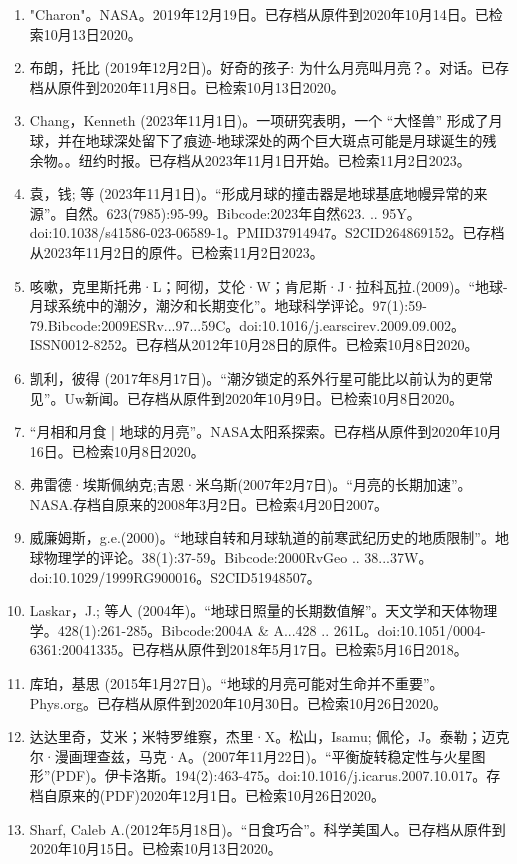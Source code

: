 \begin{enumerate}
\item "Charon"。NASA。2019年12月19日。已存档从原件到2020年10月14日。已检索10月13日2020。
\item 布朗，托比 (2019年12月2日)。好奇的孩子: 为什么月亮叫月亮？。对话。已存档从原件到2020年11月8日。已检索10月13日2020。
\item Chang，Kenneth (2023年11月1日)。一项研究表明，一个 “大怪兽” 形成了月球，并在地球深处留下了痕迹-地球深处的两个巨大斑点可能是月球诞生的残余物。。纽约时报。已存档从2023年11月1日开始。已检索11月2日2023。
\item 袁，钱; 等 (2023年11月1日)。“形成月球的撞击器是地球基底地幔异常的来源”。自然。623(7985):95-99。Bibcode:2023年自然623. .. 95Y。doi:10.1038/s41586-023-06589-1。PMID37914947。S2CID264869152。已存档从2023年11月2日的原件。已检索11月2日2023。  
\item 咳嗽，克里斯托弗·L；阿彻，艾伦·W；肯尼斯·J·拉科瓦拉.(2009)。“地球-月球系统中的潮汐，潮汐和长期变化”。地球科学评论。97(1):59-79.Bibcode:2009ESRv...97...59C。doi:10.1016/j.earscirev.2009.09.002。ISSN0012-8252。已存档从2012年10月28日的原件。已检索10月8日2020。 
\item 凯利，彼得 (2017年8月17日)。“潮汐锁定的系外行星可能比以前认为的更常见”。Uw新闻。已存档从原件到2020年10月9日。已检索10月8日2020。
\item “月相和月食 | 地球的月亮”。NASA太阳系探索。已存档从原件到2020年10月16日。已检索10月8日2020。
\item 弗雷德·埃斯佩纳克;吉恩·米乌斯(2007年2月7日)。“月亮的长期加速”。NASA.存档自原来的2008年3月2日。已检索4月20日2007。
\item 威廉姆斯，g.e.(2000)。“地球自转和月球轨道的前寒武纪历史的地质限制”。地球物理学的评论。38(1):37-59。Bibcode:2000RvGeo .. 38...37W。doi:10.1029/1999RG900016。S2CID51948507。 
\item Laskar，J.; 等人 (2004年)。“地球日照量的长期数值解”。天文学和天体物理学。428(1):261-285。Bibcode:2004A & A...428 .. 261L。doi:10.1051/0004-6361:20041335。已存档从原件到2018年5月17日。已检索5月16日2018。
\item 库珀，基思 (2015年1月27日)。“地球的月亮可能对生命并不重要”。Phys.org。已存档从原件到2020年10月30日。已检索10月26日2020。
\item 达达里奇，艾米；米特罗维察，杰里·X。松山，Isamu; 佩伦，J。泰勒；迈克尔·漫画理查兹，马克·A。(2007年11月22日)。“平衡旋转稳定性与火星图形”(PDF)。伊卡洛斯。194(2):463-475。doi:10.1016/j.icarus.2007.10.017。存档自原来的(PDF)2020年12月1日。已检索10月26日2020。
\item Sharf, Caleb A.(2012年5月18日)。“日食巧合”。科学美国人。已存档从原件到2020年10月15日。已检索10月13日2020。

\end{enumerate}
